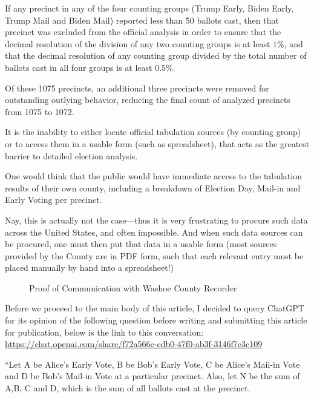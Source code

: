 \documentclass[preprint,13pt]{elsarticle}
\begin{document}
If any precinct in any of the four counting groups (Trump Early, Biden Early, Trump Mail and Biden Mail) reported less than 50 ballots cast, then that precinct was excluded from the official analysis in order to ensure that the decimal resolution of the division of any two counting groups is at least $1\%$, and that the decimal resolution of any counting group divided by the total number of ballots cast in all four groups is at least $0.5\%.$

Of these 1075 precincts, an additional three precincts were removed for outstanding outlying behavior, reducing the final count of analyzed precincts from 1075 to 1072.

It is the inability to either locate official tabulation sources (by counting group) or to access them in a usable form (such as spreadsheet), that acts as the greatest barrier to detailed election analysis.

One would think that the public would have immediate access to the tabulation results of their own county, including a breakdown of Election Day, Mail-in and Early Voting per precinct. 

Nay, this is actually not the case---thus it is very frustrating to procure such data across the United States, and often impossible. And when such data sources can be procured, one must then put that data in a usable form (most sources provided by the County are in PDF form, such that each relevant entry must be placed manually by hand into a spreadsheet!)
\newpage
\begin{figure}
\caption{Proof of Communication with Washoe County Recorder}
    \centering
\end{figure}

Before we proceed to the main body of this article, I decided to query ChatGPT for its opinion of the following question before writing and submitting this article for publication, below is the link to this conversation:
\url{https://chat.openai.com/share/f72a566c-cdb0-47f0-ab3f-3146f7e3c109}

``Let A be Alice's Early Vote, B be Bob's Early Vote, C be Alice's Mail-in Vote and D be Bob's Mail-in Vote at a particular precinct. Also, let N be the sum of A,B, C and D, which is the sum of all ballots cast at the precinct.
\end{document}
